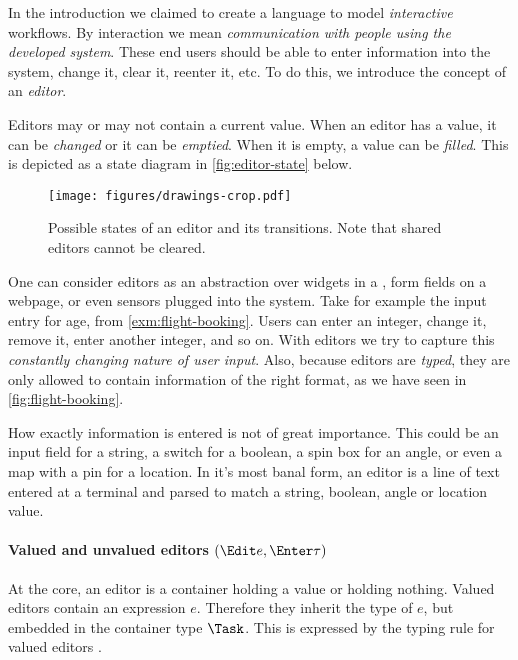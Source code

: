 In the introduction we claimed to create a language to model \emph{interactive} workflows.
By interaction we mean \emph{communication with people using the developed system}.
These end users should be able to enter information into the system,
change it, clear it, reenter it, etc.
To do this, we introduce the concept of an \emph{editor}.

Editors may or may not contain a current value.
When an editor has a value, it can be \emph{changed} or it can be \emph{emptied}.
When it is empty, a value can be \emph{filled}.
This is depicted as a state diagram in \autoref{fig:editor-state} below.

\begin{figure}[h]
  \centering
  \texttt{[image: figures/drawings-crop.pdf]}
  \caption{
    Possible states of an editor and its transitions.
    Note that shared editors cannot be cleared.
  }
  \label{fig:editor-state}
\end{figure}

One can consider editors as an abstraction over widgets in a \GUI,
form fields on a webpage,
or even sensors plugged into the system.
Take for example the input entry for age,
from \autoref{exm:flight-booking}.
Users can enter an integer, change it, remove it, enter another integer, and so on.
With editors we try to capture this \emph{constantly changing nature of user input}.
Also, because editors are \emph{typed},
they are only allowed to contain information of the right format,
as we have seen in \autoref{fig:flight-booking}.

How exactly information is entered is not of great importance.
This could be an input field for a string,
a switch for a boolean,
a spin box for an angle,
or even a map with a pin for a location.
In it's most banal form,
an editor is a line of text entered at a terminal and parsed to match
a string, boolean, angle or location value.



\paragraph{Valued and unvalued editors $(\Edit e, \Enter \tau)$}

At the core,
an editor is a container holding a value
or holding nothing.
Valued editors contain an expression $e$.
Therefore they inherit the type of $e$,
but embedded in the container type $\Task$.
This is expressed by the typing rule for valued editors .

